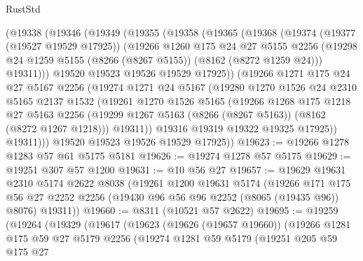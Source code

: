 \begin{lexlean}{RustStd}
\begin{coremodule}
    (@19338
      (@19346
        (@19349
          (@19355
            (@19358
              (@19365
                (@19368
                  (@19374
                    (@19377 (@19527 @19529 @17925))
                    (@19266
                      @1260
                      @175
                      @24
                      @27
                      @5155
                      @2256
                      (@19298 @24 @1259 @5155 (@8266 (@8267 @5155)) (@8162 (@8272 @1259 @24)))
                      @19311)))
                @19520
                @19523
                @19526
                @19529
                @17925))
            (@19266
              @1271
              @175
              @24
              @27
              @5167
              @2256
              (@19274
                @1271
                @24
                @5167
                (@19280
                  @1270
                  @1526
                  @24
                  @2310
                  @5165
                  @2137
                  @1532
                  (@19261
                    @1270
                    @1526
                    @5165
                    (@19266
                      @1268
                      @175
                      @1218
                      @27
                      @5163
                      @2256
                      (@19299 @1267 @5163 (@8266 (@8267 @5163)) (@8162 (@8272 @1267 @1218)))
                      @19311))
                  @19316
                  @19319
                  @19322
                  @19325
                  @17925))
              @19311)))
        @19520
        @19523
        @19526
        @19529
        @17925))
@19623 := @19266 @1278 @1283 @57 @61 @5175 @5181
@19626 := @19274 @1278 @57 @5175
@19629 := @19251 @307 @57 @1200
@19631 := @10 @56 @27
@19657 := @19629
    @19631
    @2310
    @5174
    @2622
    @8038
    (@19261
      @1200
      @19631
      @5174
      (@19266
        @171
        @175
        @56
        @27
        @2252
        @2256
        (@19430 @96 @56 @96 @2252 (@8065 (@19435 @96)) @8076)
        @19311))
@19660 := @8311 (@10521 @57 @2622)
@19695 := @19259
    (@19264
      (@19329
        (@19617
          (@19623
            (@19626 (@19657 @19660))
            (@19266
              @1281
              @175
              @59
              @27
              @5179
              @2256
              (@19274
                @1281
                @59
                @5179
                (@19251
                  @205
                  @59
                  @175
                  @27

\end{coremodule}
\end{lexlean}
